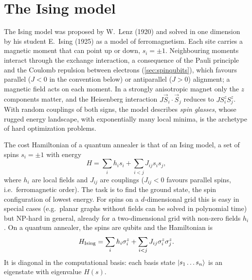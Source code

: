 \section{The Ising model}
\begin{origin}
The Ising model was proposed by W.~Lenz (1920) and solved in one dimension by his student E.~Ising (1925) as a model of ferromagnetism. Each site carries a magnetic moment that can point up or down, $s_i=\pm1$.
Neighbouring moments interact through the exchange interaction, a consequence of the Pauli principle and the Coulomb repulsion between electrons (\cref{sec:spinqubits}), which favours parallel ($J<0$ in the convention below) or
antiparallel ($J>0$) alignment; a magnetic field acts on each moment. In a strongly anisotropic magnet only the $z$ components matter, and the Heisenberg interaction $J\vec S_i\cdot\vec S_j$ reduces to $JS_i^zS_j^z$.
With random couplings of both signs, the model describes \emph{spin glasses}, whose rugged energy landscape, with exponentially many local minima, is the archetype of hard optimization problems.
\end{origin}
The cost Hamiltonian of a quantum annealer is that of an Ising model, a set of spins $s_i=\pm1$ with energy
\begin{equation}
  H=\sum_ih_is_i+\sum_{i<j}J_{ij}s_is_j,
\end{equation}
where $h_i$ are local fields and $J_{ij}$ are couplings ($J_{ij}<0$ favours parallel spins, i.e.\ ferromagnetic order). The task is to find the ground state, the spin configuration of lowest energy. For spins on a
$d$-dimensional grid this is easy in special cases (e.g.\ planar graphs without fields can be solved in polynomial time) but NP-hard in general, already for a two-dimensional grid with non-zero fields $h_i$ \cite{Barahona1982}.
On a quantum annealer, the spins are qubits and the Hamiltonian is
\begin{equation}
  H_{\rm Ising}=\sum_ih_i\sigma_i^z+\sum_{i<j}J_{ij}\sigma_i^z\sigma_j^z .
\end{equation}
It is diagonal in the computational basis: each basis state $\left|s_1\dots s_n\right\rangle$ is an eigenstate with eigenvalue $H(s)$.

